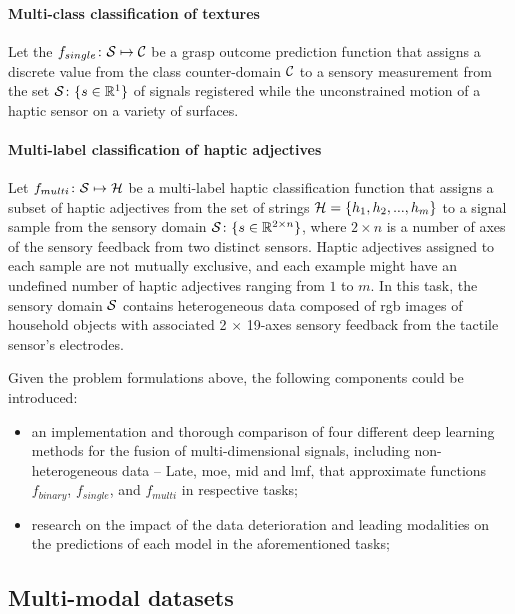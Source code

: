 \documentclass[a4paper, 10pt, twoside]{report}
\begin{document}
\paragraph{Multi-class classification of textures} Let the $f_{single} \colon {\cal S} \mapsto {\cal C}$ be a grasp outcome prediction function that assigns a discrete value from the class counter-domain ${\cal C}$ to a sensory measurement from the set ${\cal S} \colon \{s \in \mathbb{R}^{1}\}$ of signals registered while the unconstrained motion of a haptic sensor on a variety of surfaces.

\paragraph{Multi-label classification of haptic adjectives} Let $f_{multi} \colon {\cal S} \mapsto {\cal H}$ be a multi-label haptic classification function that assigns a subset of haptic adjectives from the set of strings ${\cal H} = \{h_1, h_2, ..., h_m\}$ to a signal sample from the sensory domain ${\cal S} \colon \{s \in \mathbb{R}^{2\times n}\}$, where $2 \times n$ is a number of axes of the sensory feedback from two distinct sensors. Haptic adjectives assigned to each sample are not mutually exclusive, and each example might have an undefined number of haptic adjectives ranging from $1$ to $m$. In this task, the sensory domain ${\cal S}$ contains heterogeneous data composed of \acrshort{rgb} images of household objects with associated 2 $\times$ 19-axes sensory feedback from the tactile sensor's electrodes.

Given the problem formulations above, the following components could be introduced:

\begin{itemize}
    \item an implementation and thorough comparison of four different deep learning methods for the fusion of multi-dimensional signals, including non-heterogeneous data -- Late, \acrshort{moe}, \acrshort{mid} and \acrshort{lmf}, that approximate functions $f_{binary}$, $f_{single}$, and $f_{multi}$ in respective tasks;
    \item research on the impact of the data deterioration and leading modalities on the predictions of each model in the aforementioned tasks;
\end{itemize}

\subsection{Multi-modal datasets}
\label{part:methods:fusion:multimodal:datasets}
\end{document}
